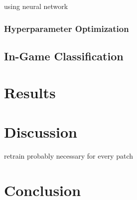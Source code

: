 \documentclass[12pt, a4paper, headinclude, twoside, plainheadsepline, open=right, numbers=noenddot, hidelinks, toc=listof, toc=bibliography]{scrreprt}
\begin{document}
using neural network

\subsection{Hyperparameter Optimization}
\label{ssec:hyperparam_optim}



\section{In-Game Classification}
\label{sec:ingame_class}



\chapter{Results}
\label{chap:results}


\chapter{Discussion}
\label{chap:discussion}

retrain probably necessary for every patch


\chapter{Conclusion}
\label{chap:conclusion}

%
%
%
\printbibliography






\listoffigures																			%
\listoftables																			%
\cleardoublepage{}	%
\printacronyms[heading={chapter*}, name={List of Abbreviations}]
\end{document}
